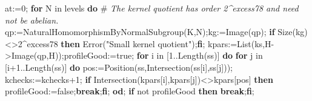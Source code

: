 \documentclass[
  10pt,
  letterpaper,
]{article}
\newenvironment{Shaded}{}{}
\newcommand{\BuiltInTok}[1]{\textcolor[rgb]{0.00,0.50,0.00}{#1}}
\newcommand{\CommentTok}[1]{\textcolor[rgb]{0.38,0.63,0.69}{\textit{#1}}}
\newcommand{\ConstantTok}[1]{\textcolor[rgb]{0.53,0.00,0.00}{#1}}
\newcommand{\ControlFlowTok}[1]{\textcolor[rgb]{0.00,0.44,0.13}{\textbf{#1}}}
\newcommand{\ExtensionTok}[1]{#1}
\newcommand{\FloatTok}[1]{\textcolor[rgb]{0.25,0.63,0.44}{#1}}
\newcommand{\NormalTok}[1]{#1}
\newcommand{\OperatorTok}[1]{\textcolor[rgb]{0.40,0.40,0.40}{#1}}
\newcommand{\StringTok}[1]{\textcolor[rgb]{0.25,0.44,0.63}{#1}}
\newcommand{\VariableTok}[1]{\textcolor[rgb]{0.10,0.09,0.49}{#1}}
\begin{document}
\begin{Shaded}
\begin{Highlighting}[]
 \VariableTok{at}\OperatorTok{:=}\FloatTok{0}\OperatorTok{;}
 \ControlFlowTok{for} \VariableTok{N} \ExtensionTok{in} \VariableTok{levels} \ControlFlowTok{do}
\NormalTok{  \#}\CommentTok{ The kernel quotient has order 2\^{}excess78 and need not be abelian.}
  \VariableTok{qp}\OperatorTok{:=}\BuiltInTok{NaturalHomomorphismByNormalSubgroup}\NormalTok{(}\VariableTok{K}\OperatorTok{,}\VariableTok{N}\NormalTok{)}\OperatorTok{;}\VariableTok{kg}\OperatorTok{:=}\BuiltInTok{Image}\NormalTok{(}\VariableTok{qp}\NormalTok{)}\OperatorTok{;}
  \ControlFlowTok{if} \BuiltInTok{Size}\NormalTok{(}\VariableTok{kg}\NormalTok{)}\OperatorTok{\textless{}\textgreater{}}\FloatTok{2}\OperatorTok{\^{}}\VariableTok{excess78} \ControlFlowTok{then} \BuiltInTok{Error}\NormalTok{(}\StringTok{"Small kernel quotient"}\NormalTok{)}\OperatorTok{;}\ControlFlowTok{fi}\OperatorTok{;}
  \VariableTok{kpars}\OperatorTok{:=}\BuiltInTok{List}\NormalTok{(}\VariableTok{ks}\OperatorTok{,}\VariableTok{H}\OperatorTok{{-}\textgreater{}}\BuiltInTok{Image}\NormalTok{(}\VariableTok{qp}\OperatorTok{,}\VariableTok{H}\NormalTok{))}\OperatorTok{;}\VariableTok{profileGood}\OperatorTok{:=}\ConstantTok{true}\OperatorTok{;}
  \ControlFlowTok{for} \VariableTok{i} \ExtensionTok{in}\NormalTok{ [}\FloatTok{1}\OperatorTok{..}\BuiltInTok{Length}\NormalTok{(}\VariableTok{ss}\NormalTok{)] }\ControlFlowTok{do}
   \ControlFlowTok{for} \VariableTok{j} \ExtensionTok{in}\NormalTok{ [}\VariableTok{i}\OperatorTok{+}\FloatTok{1}\OperatorTok{..}\BuiltInTok{Length}\NormalTok{(}\VariableTok{ss}\NormalTok{)] }\ControlFlowTok{do}
    \VariableTok{pos}\OperatorTok{:=}\BuiltInTok{Position}\NormalTok{(}\VariableTok{ss}\OperatorTok{,}\BuiltInTok{Intersection}\NormalTok{(}\VariableTok{ss}\NormalTok{[}\VariableTok{i}\NormalTok{]}\OperatorTok{,}\VariableTok{ss}\NormalTok{[}\VariableTok{j}\NormalTok{]))}\OperatorTok{;}
    \VariableTok{kchecks}\OperatorTok{:=}\VariableTok{kchecks}\OperatorTok{+}\FloatTok{1}\OperatorTok{;}
    \ControlFlowTok{if} \BuiltInTok{Intersection}\NormalTok{(}\VariableTok{kpars}\NormalTok{[}\VariableTok{i}\NormalTok{]}\OperatorTok{,}\VariableTok{kpars}\NormalTok{[}\VariableTok{j}\NormalTok{])}\OperatorTok{\textless{}\textgreater{}}\VariableTok{kpars}\NormalTok{[}\VariableTok{pos}\NormalTok{] }\ControlFlowTok{then} \VariableTok{profileGood}\OperatorTok{:=}\ConstantTok{false}\OperatorTok{;}\ControlFlowTok{break}\OperatorTok{;}\ControlFlowTok{fi}\OperatorTok{;}
   \ControlFlowTok{od}\OperatorTok{;}
   \ControlFlowTok{if} \ConstantTok{not} \VariableTok{profileGood} \ControlFlowTok{then} \ControlFlowTok{break}\OperatorTok{;}\ControlFlowTok{fi}\OperatorTok{;}

\end{Highlighting}
\end{Shaded}
\end{document}
